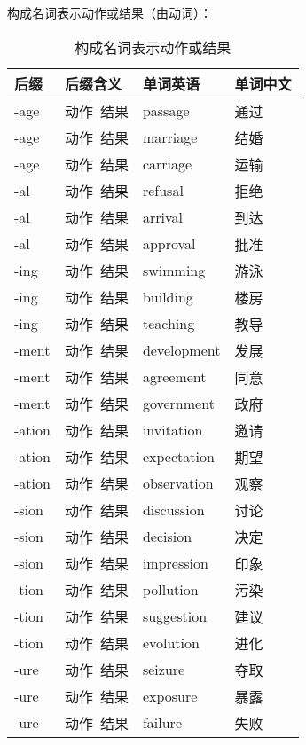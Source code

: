 \documentclass[UTF8]{ctexart}
\begin{document}
\newpage

    构成名词表示动作或结果（由动词）：\vspace{5pt}
    \begin{table}[h!]
        \begin{center}
            \ttfamily
            \begin{tabular}{p{40pt}|p{80pt}|p{80pt}|p{80pt}}
                \hline
                后缀&后缀含义&单词英语&单词中文\\ \hline
                -age&动作~结果&passage&通过\\ \hline
                -age&动作~结果&marriage&结婚\\ \hline
                -age&动作~结果&carriage&运输\\ \hline
                -al&动作~结果&refusal&拒绝\\ \hline
                -al&动作~结果&arrival&到达\\ \hline
                -al&动作~结果&approval&批准\\ \hline
                -ing&动作~结果&swimming&游泳\\ \hline
                -ing&动作~结果&building&楼房\\ \hline
                -ing&动作~结果&teaching&教导\\ \hline
                -ment&动作~结果&development&发展\\ \hline
                -ment&动作~结果&agreement&同意\\ \hline
                -ment&动作~结果&government&政府\\ \hline
                -ation&动作~结果&invitation&邀请\\ \hline
                -ation&动作~结果&expectation&期望\\ \hline
                -ation&动作~结果&observation&观察\\ \hline
                -sion&动作~结果&discussion&讨论\\ \hline
                -sion&动作~结果&decision&决定\\ \hline
                -sion&动作~结果&impression&印象\\ \hline
                -tion&动作~结果&pollution&污染\\ \hline
                -tion&动作~结果&suggestion&建议\\ \hline
                -tion&动作~结果&evolution&进化\\ \hline
                -ure&动作~结果&seizure&夺取\\ \hline
                -ure&动作~结果&exposure&暴露\\ \hline
                -ure&动作~结果&failure&失败\\ \hline
            \end{tabular}
            \rmfamily
            \caption{构成名词表示动作或结果}
        \end{center}
    \end{table}\\
\end{document}
